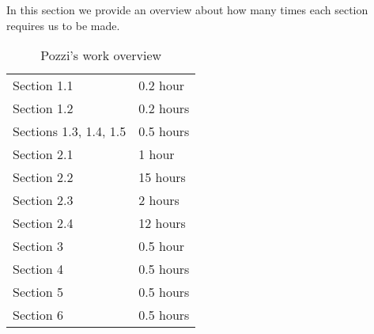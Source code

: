 In this section we provide an overview about how many times each section requires us to be made.


\begin{table} [H]
\centering
{}
{\centering
\begin{tabular}{m{2.5in}|m{.9in}}
Section 1.1 & 0.2 hour\\
Section 1.2 & 0.2 hours\\
Sections 1.3, 1.4, 1.5 & 0.5 hours\\
Section 2.1 & 1 hour\\
Section 2.2 & 15 hours\\
Section 2.3 & 2 hours\\
Section 2.4 & 12 hours\\
Section 3 & 0.5 hour\\
Section 4 & 0.5 hours\\
Section 5 & 0.5 hours\\
Section 6 & 0.5 hours\\
\end{tabular}
}
\caption{Pozzi's work overview}
\end{table}
